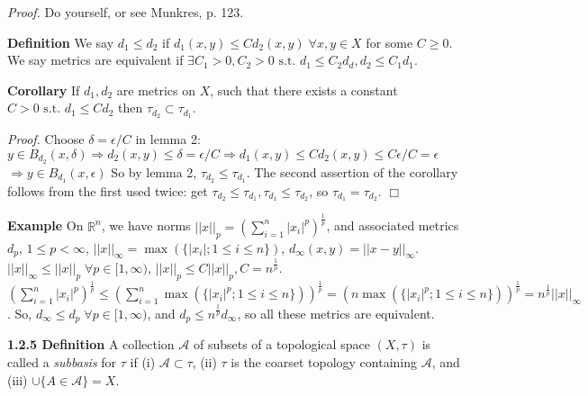 \documentclass[12pt]{article}
\newcommand{\st}[0]{ \textrm{ s.t. } }
\newcommand{\rimply}[0] { \Rightarrow }
\newcommand{\reals}[0] { \mathbb{R}}
\newcommand{\eps}[0] {  \epsilon }
\newcommand{\A}[0] { \mathcal{A} }
\begin{document}
\begin{flushleft} \emph{Proof.  } Do yourself, or see Munkres, p. 123.
\end{flushleft}

\begin{flushleft} {\bf Definition } We say $d_1 \le d_2$ if $d_1(x,y) \le C d_2(x,y) \; \forall x,y \in X$ for some $C \ge 0$. We say metrics are equivalent if $\exists C_1 >0, C_2>0 \st d_1 \le C_2 d_d, d_2 \le C_1 d_1$.
\end{flushleft}

\begin{flushleft} {\bf Corollary} If $d_1, d_2$ are metrics on $X$, such that there exists a constant $C>0 \st d_1 \le C d_2$ then $\tau_{d_2} \subset \tau_{d_1}$.
\end{flushleft}

\begin{flushleft} \emph{Proof.  } Choose $\delta = \eps / C$ in lemma 2: $y \in B_{d_2}(x, \delta) \rimply d_2(x,y) \le \delta = \eps / C \rimply d_1(x,y) \le C d_2(x,y) \le C \eps / C = \eps$ $\rimply y \in B_{d_1}(x, \eps)$ So by lemma 2, $\tau_{d_2} \le \tau_{d_1}$. The second assertion of the corollary follows from the first used twice: get $\tau_{d_2} \le \tau_{d_1}, \tau_{d_1} \le \tau_{d_2}$, so $\tau_{d_1} = \tau_{d_2}$. $\Box$
\end{flushleft}


\begin{flushleft} {\bf Example } On $\reals^n$, we have norms $||x||_p = \left( \sum_{i=1}^n |x_i|^p \right) ^{\frac{1}{p}}$, and associated metrics $d_p$, $1 \le p < \infty$, $||x||_\infty = \max ( \{ |x_i|; 1 \le i \le n \})$, $d_\infty(x,y) = ||x-y||_\infty$. $||x||_\infty \le || x || _p \; \forall p \in [1, \infty)$, $||x||_p \le C ||x||_p, C = n^\frac{1}{p}$. $ \left( \sum_{i=1}^n |x_i|^p \right) ^{\frac{1}{p}} \le  \left( \sum_{i=1}^n  \max ( \{ |x_i|^p; 1 \le i \le n \}) \right) ^{\frac{1}{p}} =   \left( n  \max ( \{ |x_i|^p; 1 \le i \le n \}) \right) ^{\frac{1}{p}} = n^\frac{1}{p} ||x||_\infty  $. So, $d_\infty \le d_p \; \forall p \in [1,\infty)$, and $d_p \le n^\frac{1}{p} d_\infty$, so all these metrics are equivalent.
\end{flushleft}

\begin{flushleft} {\bf 1.2.5 Definition } A collection $\A$ of subsets of a topological space $(X, \tau)$ is called a \emph{subbasis} for $\tau$ if (i) $\A \subset \tau$, (ii) $\tau$ is the coarset topology containing $\A$, and (iii) $\cup \{A \in \A \} = X$.
\end{flushleft}
\end{document}
